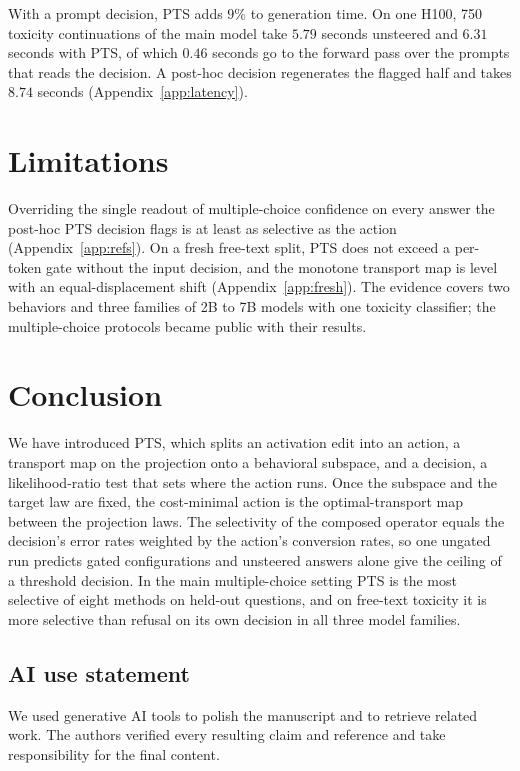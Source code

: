 \documentclass{article}
\begin{document}
With a prompt decision, PTS adds $9\%$ to generation time. On one H100, 750
toxicity continuations of the main model take $5.79$ seconds unsteered and
$6.31$ seconds with PTS, of which $0.46$ seconds go to the forward pass over the
prompts that reads the decision. A post-hoc decision regenerates the flagged
half and takes $8.74$ seconds (Appendix~\ref{app:latency}).

\section{Limitations}

Overriding the single readout of multiple-choice confidence on every answer
the post-hoc PTS decision flags is at least as selective as the action
(Appendix~\ref{app:refs}). On a fresh free-text split, PTS does not exceed a
per-token gate without the input decision, and the monotone transport map is
level with an equal-displacement shift (Appendix~\ref{app:fresh}). The evidence
covers two behaviors and three families of 2B to 7B models with one toxicity
classifier; the multiple-choice protocols became public with their results.

\section{Conclusion}

We have introduced PTS, which splits an activation edit into an action, a
transport map on the projection onto a behavioral subspace, and a decision, a
likelihood-ratio test that sets where the action runs. Once the subspace and
the target law are fixed, the cost-minimal action is the optimal-transport map
between the projection laws. The selectivity of the composed operator equals
the decision's error rates weighted by the action's conversion rates, so one
ungated run predicts gated configurations and unsteered answers alone give the
ceiling of a threshold decision. In the main multiple-choice setting PTS is the
most selective of eight methods on held-out questions, and on free-text
toxicity it is more selective than refusal on its own decision in all three
model families.
\subsection*{AI use statement}

We used generative AI tools to polish the manuscript and to retrieve related
work. The authors verified every resulting claim and reference and take
responsibility for the final content.
\end{document}
